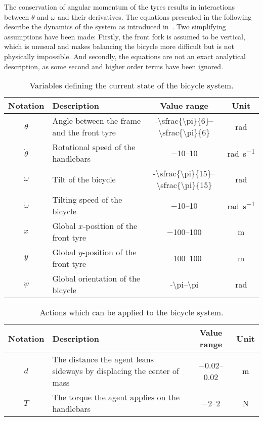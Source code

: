 The conservation of angular momentum of the tyres results in interactions between $\theta$ and $\omega$ and their derivatives.
The equations presented in the following describe the dynamics of the system as introduced in~\cite{randlov_learning_1998}.
Two simplifying assumptions have been made:
Firstly, the front fork is assumed to be vertical, which is unusual and makes balancing the bicycle more difficult but is not physically impossible.
And secondly, the equations are not an exact analytical description, as some second and higher order terms have been ignored.
\begin{table}[p]
    \centering
    \caption{Variables defining the current state of the bicycle system.}
    \label{tab:bicycle_variables}
    \begin{tabularx}{\tablewidth}{cXcc}
        \toprule
        Notation & Description & Value range & Unit \\
        \midrule
        $\theta$ & Angle between the frame and the front tyre & \numrange[parse-numbers=false]{-\sfrac{\pi}{6}}{\sfrac{\pi}{6}} & \si{\radian} \\
        $\dot{\theta}$ & Rotational speed of the handlebars & \numrange{-10}{10} & \si{\radian\per\second} \\
        $\omega$ & Tilt of the bicycle & \numrange[parse-numbers=false]{-\sfrac{\pi}{15}}{\sfrac{\pi}{15}} & \si{\radian} \\
        $\dot{\omega}$ & Tilting speed of the bicycle & \numrange{-10}{10} & \si{\radian\per\second} \\
        $x$ & Global $x$-position of the front tyre & \numrange{-100}{100} & \si{\metre} \\
        $y$ & Global $y$-position of the front tyre & \numrange{-100}{100} & \si{\metre} \\
        $\psi$ & Global orientation of the bicycle & \numrange[parse-numbers=false]{-\pi}{\pi} & \si{\radian} \\
        \bottomrule
    \end{tabularx}
\end{table}
\begin{table}[p]
    \centering
    \caption{Actions which can be applied to the bicycle system.}
    \label{tab:bicycle_actions}
    \begin{tabularx}{\tablewidth}{cXcc}
        \toprule
        Notation & Description & Value range & Unit \\
        \midrule
        $d$ & The distance the agent leans sideways by displacing the center of mass & \numrange{-0.02}{0.02} & \si{\metre} \\
        $T$ & The torque the agent applies on the handlebars & \numrange{-2}{2} & \si{\N} \\
        \bottomrule
    \end{tabularx}
\end{table}
